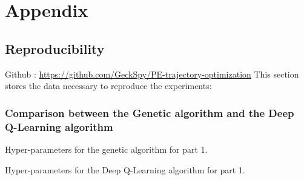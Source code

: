 \documentclass[11pt,a4paper]{article}
\begin{document}
    
    


\newpage
\section*{Appendix}
\subsection*{Reproducibility}
Github : \url{https://github.com/GeckSpy/PE-trajectory-optimization}
This section stores the data necessary to reproduce the experiments: \subsubsection*{Comparison between the Genetic algorithm and the Deep Q-Learning algorithm}
Hyper-parameters for the genetic algorithm for part 1.
\begin{mybox}
    \tiny{
}
\end{mybox}
\label{Hyperparameters}
Hyper-parameters for the Deep Q-Learning algorithm for part 1.
\begin{mybox}
    \tiny{
}
\end{mybox}
\end{document}
